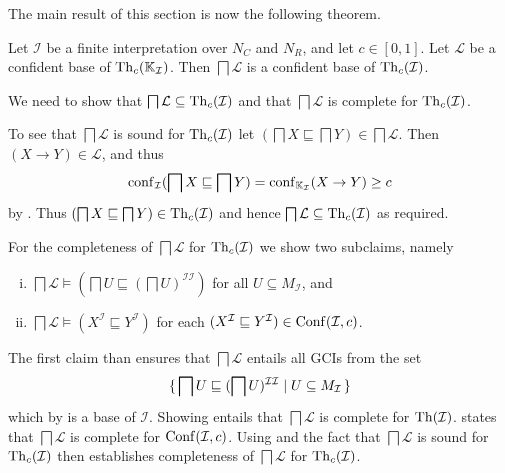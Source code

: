 The main result of this section is now the following theorem.

\begin{Theorem}
  \label{thm:confident-bases-of-GCIs-from-confident-bases-of-implications}
  Let $\mathcal{I}$ be a finite interpretation over $N_C$ and $N_R$, and let $c \in
  [0,1]$.  Let $\mathcal{L}$ be a confident base of $\operatorname{Th}_c({\mathbb{K}}_{\mathcal{I}})$.  Then
  $\bigsqcap \mathcal{L}$ is a confident base of $\operatorname{Th}_c(\mathcal{I})$.
\end{Theorem}
\begin{Proof}
  We need to show that $\bigsqcap \mathcal{L} \subseteq \operatorname{Th}_c(\mathcal{I})$ and that
  $\bigsqcap \mathcal{L}$ is complete for $\operatorname{Th}_c(\mathcal{I})$.

  To see that $\bigsqcap \mathcal{L}$ is sound for $\operatorname{Th}_c(\mathcal{I})$ let $(\bigsqcap X
  \sqsubseteq \bigsqcap Y) \in \bigsqcap \mathcal{L}$.  Then $(X \to Y) \in \mathcal{L}$,
  and thus
  \begin{equation*}
    \operatorname{conf}_{\mathcal{I}}(\bigsqcap X \sqsubseteq \bigsqcap Y) = \operatorname{conf}_{{\mathbb{K}}_{\mathcal{I}}}(X \to Y) \ge c
  \end{equation*}
  by .  Thus
  $(\bigsqcap X \sqsubseteq \bigsqcap Y) \in \operatorname{Th}_c(\mathcal{I})$ and hence $\bigsqcap
  \mathcal{L} \subseteq \operatorname{Th}_c(\mathcal{I})$ as required.

  For the completeness of $\bigsqcap \mathcal{L}$ for $\operatorname{Th}_c(\mathcal{I})$ we show two
  subclaims, namely
  \begin{enumerate}[i. ]
  \item\label{item:16} $\bigsqcap \mathcal{L} \models (\bigsqcap U \sqsubseteq (\bigsqcap
    U)^{\mathcal{I}\mathcal{I}})$ for all $U \subseteq M_{\mathcal{I}}$, and
  \item\label{item:17} $\bigsqcap \mathcal{L} \models (X^{\mathcal{I}} \sqsubseteq
    Y^{\mathcal{I}})$ for each $(X^{\mathcal{I}} \sqsubseteq Y^{\mathcal{I}}) \in
    \operatorname{Conf}(\mathcal{I}, c)$.
  \end{enumerate}
  The first claim than ensures that $\bigsqcap \mathcal{L}$ entails all GCIs from the set
  \begin{equation*}
    {\ensuremath{\{\, \bigsqcap U \sqsubseteq (\bigsqcap U)^{\mathcal{I}\mathcal{I}} \mid U \subseteq
      M_{\mathcal{I}} \,\}}}
  \end{equation*}
  which by  is a base of $\mathcal{I}$.  Showing 
  entails that $\bigsqcap \mathcal{L}$ is complete for $\operatorname{Th}(\mathcal{I})$.  
  states that $\bigsqcap \mathcal{L}$ is complete for $\operatorname{Conf}(\mathcal{I}, c)$.  Using
   and the fact that $\bigsqcap \mathcal{L}$
  is sound for $\operatorname{Th}_c(\mathcal{I})$ then establishes completeness of $\bigsqcap
  \mathcal{L}$ for $\operatorname{Th}_c(\mathcal{I})$.


\end{Proof}
